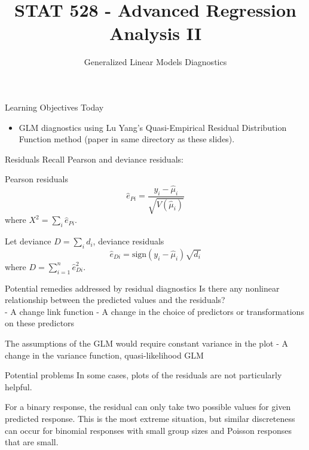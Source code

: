\documentclass[
  ignorenonframetext,
]{beamer}
\title{STAT 528 - Advanced Regression Analysis II}
\author{Generalized Linear Models Diagnostics}
\date{}
\institute{Daniel J. Eck (with credit to Lu Yang)\\
Department of Statistics\\
University of Illinois}
\providecommand{\tightlist}{%
  \setlength{\itemsep}{0pt}\setlength{\parskip}{0pt}}
\begin{document}
\frame{\titlepage}

\begin{frame}{Learning Objectives Today}
\protect\hypertarget{learning-objectives-today}{}
\begin{itemize}
\tightlist
\item
  GLM diagnostics using Lu Yang's Quasi-Empirical Residual Distribution
  Function method (paper in same directory as these slides).
\end{itemize}
\end{frame}

\begin{frame}{Residuals}
\protect\hypertarget{residuals}{}
Recall Pearson and deviance residuals:

\vspace{12pt}

Pearson residuals
\[\hat{e}_{Pi}=\frac{y_i-\hat{\mu}_i}{\sqrt{V(\hat{\mu}_i)}}\] where
\(X^2=\sum_i\hat{e}_{Pi}\).

\vspace{12pt}

Let deviance \(D=\sum_id_i\), deviance residuals
\[\hat{e}_{Di}=\mathrm{sign}\left(y_i-\hat{\mu}_i\right)\sqrt{d_i}\]
where \(D=\sum_{i=1}^n\hat{e}_{Di}^2\).
\end{frame}

\begin{frame}{Potential remedies addressed by residual diagnostics}
\protect\hypertarget{potential-remedies-addressed-by-residual-diagnostics}{}
Is there any nonlinear relationship between the predicted values and the
residuals?\\
- A change link function - A change in the choice of predictors or
transformations on these predictors

\vspace{12pt}

The assumptions of the GLM would require constant variance in the plot -
A change in the variance function, quasi-likelihood GLM
\end{frame}

\begin{frame}{Potential problems}
\protect\hypertarget{potential-problems}{}
In some cases, plots of the residuals are not particularly helpful.

\vspace{12pt}

For a binary response, the residual can only take two possible values
for given predicted response. This is the most extreme situation, but
similar discreteness can occur for binomial responses with small group
sizes and Poisson responses that are small.
\end{frame}
\end{document}
